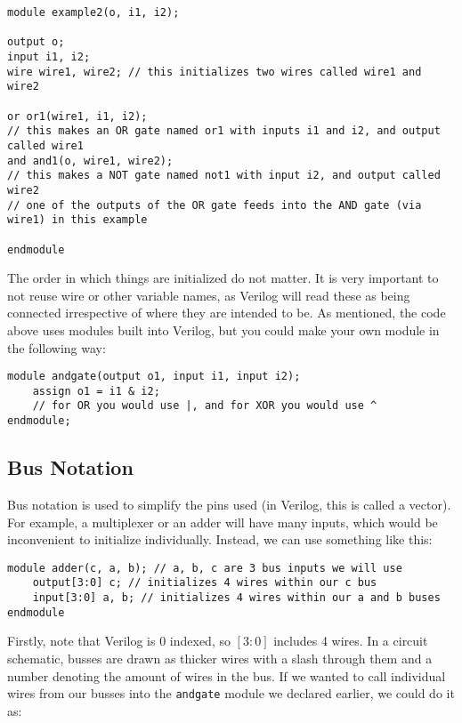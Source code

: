 \documentclass[12pt]{report}
\newcommand{\lst}{\lstinline}
\newcommand{\bs}{\bigskip}
\begin{document}
\bs

\begin{lstlisting}
module example2(o, i1, i2); 

output o; 
input i1, i2; 
wire wire1, wire2; // this initializes two wires called wire1 and wire2

or or1(wire1, i1, i2); 
// this makes an OR gate named or1 with inputs i1 and i2, and output called wire1
and and1(o, wire1, wire2);
// this makes a NOT gate named not1 with input i2, and output called wire2
// one of the outputs of the OR gate feeds into the AND gate (via wire1) in this example

endmodule
\end{lstlisting}

\bs

The order in which things are initialized do not matter. It is very important to not reuse wire or other variable names, as Verilog will read these as being connected irrespective of where they are intended to be. As mentioned, the code above uses modules built into Verilog, but you could make your own module in the following way: 

\bs 
\begin{lstlisting}
module andgate(output o1, input i1, input i2);
    assign o1 = i1 & i2;
    // for OR you would use |, and for XOR you would use ^
endmodule;
\end{lstlisting}
\bs


\subsection{Bus Notation} Bus notation is used to simplify the pins used (in Verilog, this is called a vector). For example, a multiplexer or an adder will have many inputs, which would be inconvenient to initialize individually. Instead, we can use  something like this: 

\bs
\begin{lstlisting}
module adder(c, a, b); // a, b, c are 3 bus inputs we will use
    output[3:0] c; // initializes 4 wires within our c bus
    input[3:0] a, b; // initializes 4 wires within our a and b buses
endmodule
\end{lstlisting}
\bs

Firstly, note that Verilog is 0 indexed, so $[3:0]$ includes 4 wires. In a circuit schematic, busses are drawn as thicker wires with a slash through them and a number denoting the amount of wires in the bus. If we wanted to call individual wires from our busses into the \lst{andgate} module we declared earlier, we could do it as: 
\end{document}
